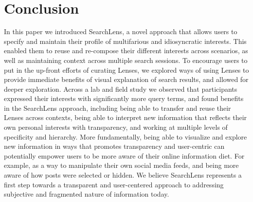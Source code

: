 \documentclass{sigchi}
\begin{document}
\section{Conclusion}

In this paper we introduced SearchLens, a novel approach that allows users to specify and maintain their profile of multifarious and idiosyncratic interests. This enabled them to reuse and re-compose their different interests across scenarios, as well as maintaining context across multiple search sessions. To encourage users to put in the up-front efforts of curating Lenses, we explored ways of using Lenses to provide immediate benefits of visual explanation of search results, and allowed for deeper exploration. Across a lab and field study we observed that participants expressed their interests with significantly more query terms, and found benefits in the SearchLens approach, including being able to transfer and reuse their Lenses across contexts, being able to interpret new information that reflects their own personal interests with transparency, and working at multiple levels of specificity and hierarchy.
More fundamentally, being able to visualize and explore new information in ways that promotes transparency and user-centric can potentially empower users to be more aware of their online information diet. For example, as a way to manipulate their own social media feeds, and being more aware of how posts were selected or hidden. We believe SearchLens represents a first step towards a transparent and user-centered approach to addressing subjective and fragmented nature of information today.






\end{document}
